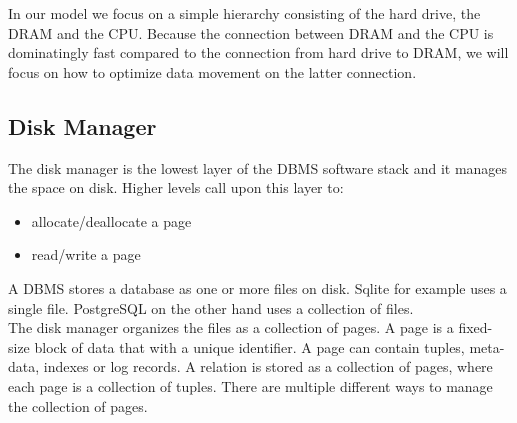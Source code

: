 In our model we focus on a simple hierarchy consisting of the hard drive, the DRAM and the CPU. Because the connection between DRAM and the CPU is dominatingly fast compared to the connection from hard drive to DRAM, we will focus on how to optimize data movement on the latter connection.

\subsection{Disk Manager}
The disk manager is the lowest layer of the DBMS software stack and it manages the space on disk. Higher levels call upon this layer to:\begin{itemize}
\item allocate/deallocate a page
\item read/write a page
\end{itemize}
A DBMS stores a database as one or more files on disk. Sqlite for example uses a single file. PostgreSQL on the other hand uses a collection of files. \\ The disk manager organizes the files as a collection of pages. A page is a fixed-size block of data that with a unique identifier. A page can contain tuples, meta-data, indexes or log records. A relation is stored as a collection of pages, where each page is a collection of tuples. There are multiple different ways to manage the collection of pages.

